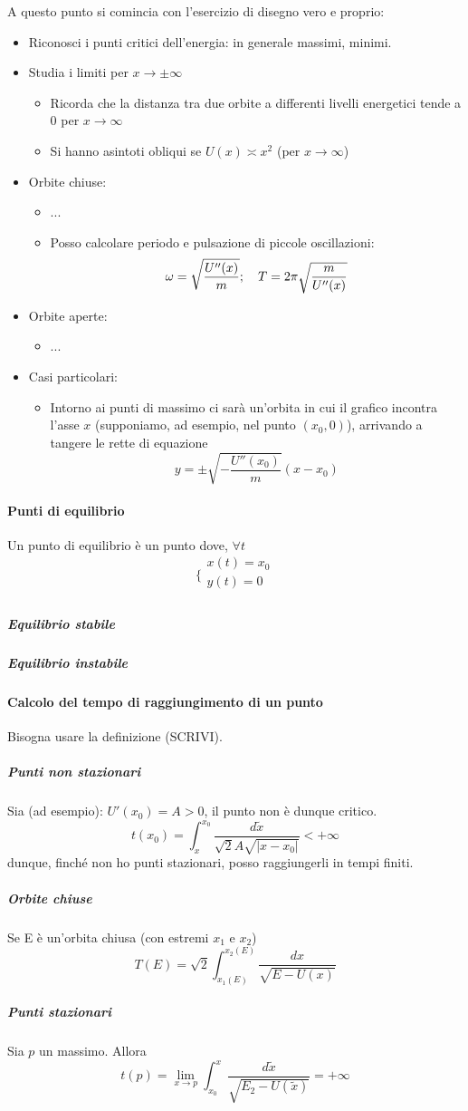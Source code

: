 \documentclass[a4paper,12pt]{article}
\begin{document}
A questo punto si comincia con l'esercizio di disegno vero e proprio:
\begin{itemize}
 \item Riconosci i punti critici dell'energia: in generale massimi, minimi.
 \item Studia i limiti per $x\to\pm\infty$
 \begin{itemize}
  \item Ricorda che la distanza tra due orbite a differenti livelli energetici tende a $0$ per $x\to\infty$
  \item Si hanno asintoti obliqui se $U(x)\asymp x^2$ (per $x\to\infty$)
 \end{itemize}

 \item Orbite chiuse:
 \begin{itemize}
  \item ...
  \item Posso calcolare periodo e pulsazione di piccole oscillazioni: $$\omega = \sqrt{U''(x)\over m};\ \ \ T = 2\pi\sqrt{m \over U''(x)}$$
 \end{itemize}
 \item Orbite aperte:
 \begin{itemize}
  \item ...
 \end{itemize}
 \item Casi particolari:
 \begin{itemize}
   \item Intorno ai punti di massimo ci sarà un'orbita in cui il grafico incontra l'asse $x$ (supponiamo, ad esempio, nel punto $(x_0, 0)$), arrivando a tangere le rette di equazione $$y = \pm\sqrt{-\dfrac{U''(x_0)}{m}}(x-x_0)$$
 \end{itemize}
\end{itemize}
\paragraph{Punti di equilibrio}
Un punto di equilibrio è un punto dove, $\forall t$
$$\bigg\{ \begin{array}{l}
x(t) = x_0\\
y(t) = 0\\
\end{array}$$
\subparagraph{Equilibrio stabile}
\subparagraph{Equilibrio instabile}

\paragraph{Calcolo del tempo di raggiungimento di un punto}
Bisogna usare la definizione (SCRIVI).
\subparagraph{Punti non stazionari}
Sia (ad esempio): $U'(x_0) = A > 0$, il punto non è dunque critico.
$$t(x_0) = \int_x^{x_0} \dfrac{d\tilde{x}}{\sqrt{2}A\sqrt{|x-x_0|}} < +\infty$$
dunque, finché non ho punti stazionari, posso raggiungerli in tempi finiti.
\subparagraph{Orbite chiuse}
Se E è un'orbita chiusa (con estremi $x_1$ e $x_2$)
$$ T(E) = \sqrt{2}\int_{x_1(E)}^{x_2(E)} \dfrac{dx}{\sqrt{E-U(x)}}$$
\subparagraph{Punti stazionari}
Sia $p$ un massimo.
Allora
$$t(p) = \lim_{x\to p} \int_{x_0}^x \dfrac{d\tilde{x}}{\sqrt{E_2 - U(\tilde{x})}} = +\infty$$
\end{document}
